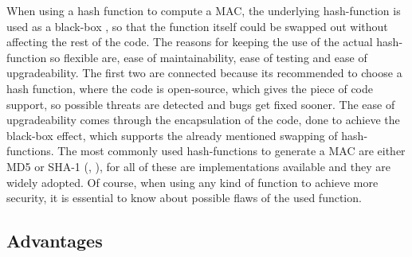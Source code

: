 When using a hash function to compute a MAC, the underlying hash-function is used as a black-box \cite{KHF}, so that the function itself could be swapped out without affecting the rest of the code. The reasons for keeping the use of the actual hash-function so flexible are, ease of maintainability, ease of testing and ease of upgradeability. The first two are connected because its recommended to choose a hash function, where the code is open-source, which gives the piece of code support, so possible threats are detected and bugs get fixed sooner. The ease of upgradeability comes through the encapsulation of the code, done to achieve the black-box effect, which supports the already mentioned swapping of hash-functions.
The most commonly used hash-functions to generate a MAC are either MD5 or SHA-1 (\cite{CRY-MD5}, \cite{NPC}), for all of these are implementations available and they are widely adopted. Of course, when using any kind of function to achieve more security, it is essential to know about possible flaws of the used function. 
\subsection{Advantages}
